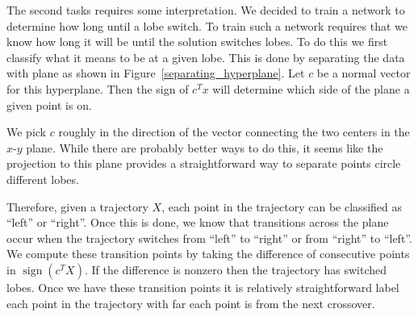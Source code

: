\documentclass[10pt]{article}
\begin{document}
The second tasks requires some interpretation. We decided to train a network to determine how long until a lobe switch. To train such a network requires that we know how long it will be until the solution switches lobes. To do this we first classify what it means to be at a given lobe. This is done by separating the data with plane as shown in Figure~\ref{separating_hyperplane}. Let \( c \) be a normal vector for this hyperplane. Then the sign of \( c^Tx \) will determine which side of the plane a given point is on.

We pick \( c \) roughly in the direction of the vector connecting the two centers in the \( x \)-\( y \) plane. While there are probably better ways to do this, it seems like the projection to this plane provides a straightforward way to separate points circle different lobes.

Therefore, given a trajectory \( X \), each point in the trajectory can be classified as ``left'' or ``right''. Once this is done, we know that transitions across the plane occur when the trajectory switches from ``left'' to ``right'' or from ``right'' to ``left''. We compute these transition points by taking the difference of consecutive points in \( \operatorname{sign}(c^TX) \). If the difference is nonzero then the trajectory has switched lobes. Once we have these transition points it is relatively straightforward label each point in the trajectory with far each point is from the next crossover.
\end{document}

